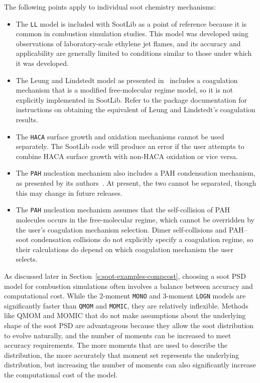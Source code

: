 \documentclass[preprint,letterpaper]{elsarticle}
\begin{document}
The following points apply to individual soot chemistry mechanisms:
\begin{itemize}
    \item The \texttt{LL} model is included with SootLib as a point of reference because it is common in combustion simulation studies. This model was developed using observations of laboratory-scale ethylene jet flames, and its accuracy and applicability are generally limited to conditions similar to those under which it was developed.
    \item The Leung and Lindstedt model as presented in~\cite{Leung_1991} includes a coagulation mechanism that is a modified free-molecular regime model, so it is not explicitly implemented in SootLib. Refer to the package documentation for instructions on obtaining the equivalent of Leung and Lindstedt's coagulation results.
    \item The \texttt{HACA} surface growth and oxidation mechanisms cannot be used separately. The SootLib code will produce an error if the user attempts to combine HACA surface growth with non-HACA oxidation or vice versa.
    \item The \texttt{PAH} nucleation mechanism also includes a PAH condensation mechanism, as presented by its authors~\cite{Blanquart_2009c}. At present, the two cannot be separated, though this may change in future releases.
    \item The \texttt{PAH} nucleation mechanism assumes that the self-collision of PAH molecules occurs in the free-molecular regime, which cannot be overridden by the user's coagulation mechanism selection. Dimer self-collisions and PAH--soot condensation collisions do not explicitly specify a coagulation regime, so their calculations do depend on which coagulation mechanism the user selects.
\end{itemize}

As discussed later in Section~\ref{s:soot-examples-compcost}, choosing a soot PSD model for combustion simulations often involves a balance between accuracy and computational cost. While the 2-moment \texttt{MONO} and 3-moment \texttt{LOGN} models are significantly faster than \texttt{QMOM} and \texttt{MOMIC}, they are relatively inflexible.
Methods like QMOM and MOMIC that do not make assumptions about the underlying shape of the soot PSD are advantageous because they allow the soot distribution to evolve naturally, and the number of moments can be increased to meet accuracy requirements. The more moments that are used to describe the distribution, the more accurately that moment set represents the underlying distribution, but increasing the number of moments can also significantly increase the computational cost of the model.
\end{document}
